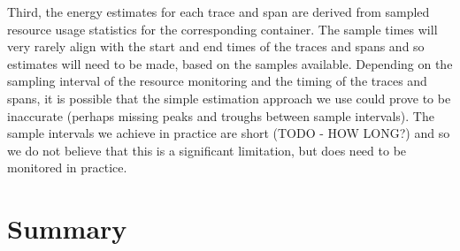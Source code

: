 Third, the energy estimates for each trace and span are derived from sampled resource usage statistics for the corresponding container.  The sample times will very rarely align with the start and end times of the traces and spans and so estimates will need to be made, based on the samples available.  Depending on the sampling interval of the resource monitoring and the timing of the traces and spans, it is possible that the simple estimation approach we use could prove to be inaccurate (perhaps missing peaks and troughs between sample intervals).  The sample intervals we achieve in practice are short (TODO - HOW LONG?) and so we do not believe that this is a significant limitation, but does need to be monitored in practice.

\section{Summary}

